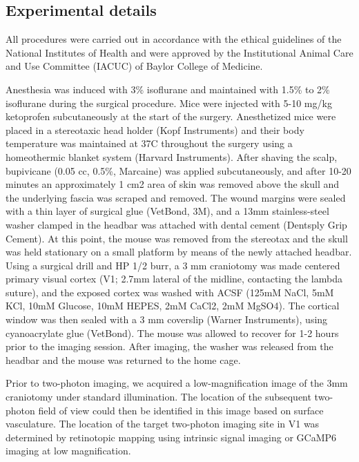\documentclass[10pt,letterpaper]{article}
\begin{document}
{\subsection{Experimental details}
All procedures were carried out in accordance with the ethical guidelines of the National Institutes of Health and were approved by the Institutional Animal Care and Use Committee (IACUC) of Baylor College of Medicine.


Anesthesia was induced with 3\% isoflurane and maintained with 1.5\% to 2\% isoflurane during the surgical procedure. Mice were injected with 5-10 mg/kg ketoprofen subcutaneously at the start of the surgery. Anesthetized mice were placed in a stereotaxic head holder (Kopf Instruments) and their body temperature was maintained at 37C throughout the surgery using a homeothermic blanket system (Harvard Instruments). After shaving the scalp, bupivicane (0.05 cc, 0.5\%, Marcaine) was applied subcutaneously, and after 10-20 minutes an approximately 1 cm2 area of skin was removed above the skull and the underlying fascia was scraped and removed. The wound margins were sealed with a thin layer of surgical glue (VetBond, 3M), and a 13mm stainless-steel washer clamped in the headbar was attached with dental cement (Dentsply Grip Cement). At this point, the mouse was removed from the stereotax and the skull was held stationary on a small platform by means of the newly attached headbar. Using a surgical drill and HP 1/2 burr, a 3 mm craniotomy was made centered primary visual cortex (V1; 2.7mm lateral of the midline, contacting the lambda suture), and the exposed cortex was washed with ACSF (125mM NaCl, 5mM KCl, 10mM Glucose, 10mM HEPES, 2mM CaCl2, 2mM MgSO4). The cortical window was then sealed with a 3 mm coverslip (Warner Instruments), using cyanoacrylate glue (VetBond). The mouse was allowed to recover for 1-2 hours prior to the imaging session. After imaging, the washer was released from the headbar and the mouse was returned to the home cage. 


Prior to two-photon imaging, we acquired a low-magnification image of the 3mm craniotomy under standard illumination. The location of the subsequent two-photon field of view could then be identified in this image based on surface vasculature. The location of the target two-photon imaging site in V1 was determined by retinotopic mapping using intrinsic signal imaging or GCaMP6 imaging at low magnification.

}
\end{document}
